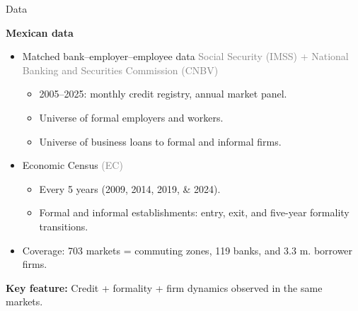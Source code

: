 \documentclass[aspectratio=169]{beamer}
\begin{document}
\begin{frame}{Data}\label{data}

\textbf{Mexican data}

\vspace{3mm}

\begin{itemize}
    \item Matched bank--employer--employee data \textcolor{gray}{Social Security (IMSS) + National Banking and Securities Commission (CNBV)}
    \begin{itemize}
        \item 2005--2025: monthly credit registry, annual market panel.
        \item Universe of formal employers and workers.
        \item Universe of business loans to formal and informal firms.
    \end{itemize}
    \vspace{3mm}
    \pause
    
    \item Economic Census \textcolor{gray}{(EC)}
    \begin{itemize}
        \item Every 5 years (2009, 2014, 2019, \& 2024).
        \item Formal and informal establishments: entry, exit, and five-year formality transitions.
    \end{itemize}
    \vspace{3mm}
    \pause
    
    \item Coverage: 703 markets = commuting zones, 119 banks, and 3.3 m. borrower firms.
\end{itemize}
\vspace{3mm}
\pause

\begin{center}
    \large \textbf{Key feature:} Credit + formality + firm dynamics observed in the same markets.
\end{center}

\end{frame}

\end{document}
